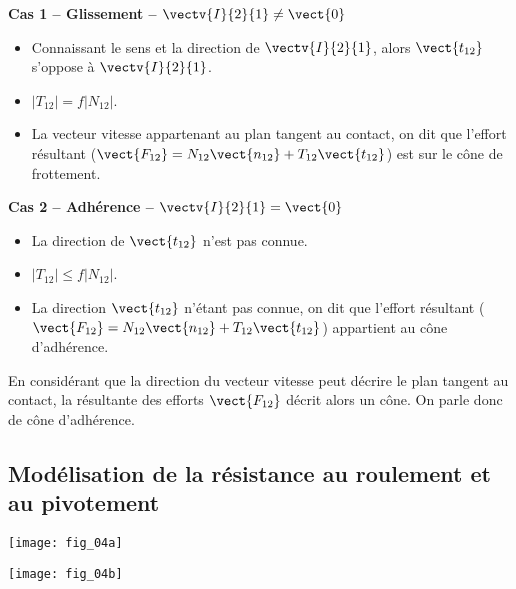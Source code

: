 \noindent\begin{minipage}[t]{.48\linewidth}
\begin{center}
\textbf{Cas 1 -- Glissement -- $\vectv{I}{2}{1}\neq \vect{0}$}
\end{center}

\begin{itemize}
\item Connaissant le sens et la direction de $\vectv{I}{2}{1}$, alors $\vect{t_{12}}$ s'oppose à $\vectv{I}{2}{1}$.
\item $|T_{12}| = f |N_{12}|$.
\item La vecteur vitesse appartenant au plan tangent au contact, on dit que l'effort résultant ($\vect{F_{12}}=N_{12} \vect{n_{12}}+T_{12} \vect{t_{12}}$) est sur le cône de frottement. 
\end{itemize}
\end{minipage}\hfill
\begin{minipage}[t]{.48\linewidth}
\begin{center}
\textbf{Cas 2 -- Adhérence -- $\vectv{I}{2}{1} = \vect{0}$}
\end{center}

\begin{itemize}
\item La direction de $\vect{t_{12}}$ n'est pas connue. 
\item $|T_{12}| \leq f |N_{12}|$.
\item La direction $\vect{t_{12}}$ n'étant pas connue, on dit que l'effort résultant ($\vect{F_{12}}=N_{12} \vect{n_{12}}+T_{12} \vect{t_{12}}$) appartient au cône d'adhérence. 
\end{itemize}
\end{minipage}


\begin{remarque}
En considérant que la direction du vecteur vitesse peut décrire le plan tangent au contact, la résultante des efforts $\vect{F_{12}}$ décrit alors un cône. On parle donc de cône d'adhérence. 
\end{remarque}

\subsection{Modélisation de la résistance au roulement et au pivotement}

\begin{marginfigure}
\begin{center}
\texttt{[image: fig\_04a]}

\texttt{[image: fig\_04b]}
\end{center}
\end{marginfigure}



